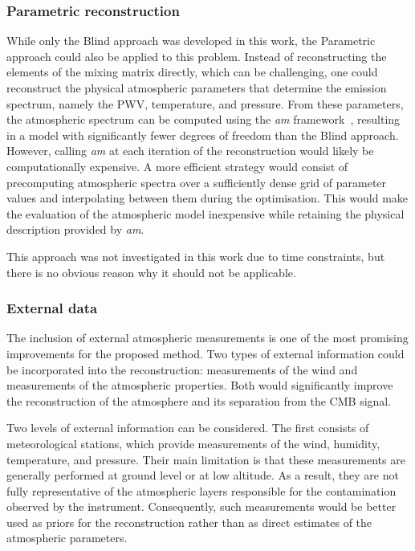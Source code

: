 \documentclass[a4paper,11pt]{article}
\begin{document}
\subsubsection{Parametric reconstruction}

While only the Blind approach was developed in this work, the Parametric approach could also be applied to this problem. Instead of reconstructing the elements of the mixing matrix directly, which can be challenging, one could reconstruct the physical atmospheric parameters that determine the emission spectrum, namely the PWV, temperature, and pressure.
From these parameters, the atmospheric spectrum can be computed using the \emph{am} framework~\cite{paine2024}, resulting in a model with significantly fewer degrees of freedom than the Blind approach. However, calling \emph{am} at each iteration of the reconstruction would likely be computationally expensive. A more efficient strategy would consist of precomputing atmospheric spectra over a sufficiently dense grid of parameter values and interpolating between them during the optimisation. This would make the evaluation of the atmospheric model inexpensive while retaining the physical description provided by \emph{am}.

This approach was not investigated in this work due to time constraints, but there is no obvious reason why it should not be applicable.

\subsubsection{External data}

The inclusion of external atmospheric measurements is one of the most promising improvements for the proposed method. Two types of external information could be incorporated into the reconstruction: measurements of the wind and measurements of the atmospheric properties. Both would significantly improve the reconstruction of the atmosphere and its separation from the CMB signal.

Two levels of external information can be considered. The first consists of meteorological stations, which provide measurements of the wind, humidity, temperature, and pressure. Their main limitation is that these measurements are generally performed at ground level or at low altitude. As a result, they are not fully representative of the atmospheric layers responsible for the contamination observed by the instrument. Consequently, such measurements would be better used as priors for the reconstruction rather than as direct estimates of the atmospheric parameters.
\end{document}
